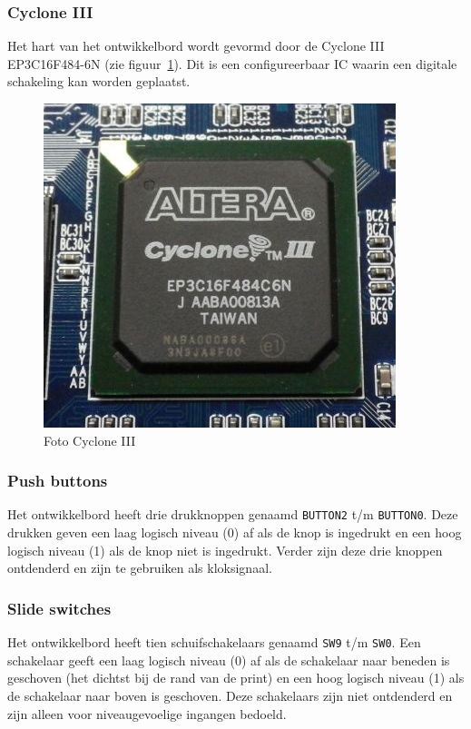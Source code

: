 \documentclass[a4paper,12pt,fleqn,twoside]{book}
\newcommand{\naam}[1]{\texttt{#1}}
\begin{document}
\subsubsection{Cyclone III}
Het hart van het ontwikkelbord wordt gevormd door de Cyclone III EP3C16F484-6N
(zie figuur~\ref{fig:ep3c16f484c6n}). Dit is een configureerbaar IC waarin een
digitale schakeling kan worden geplaatst.

\begin{figure}[H]
\centering
\includegraphics[scale=0.40]{ep3c16f484c6n.jpg}
\caption{Foto Cyclone III}
\label{fig:ep3c16f484c6n}
\end{figure}

\subsubsection{Push buttons}
Het ontwikkelbord heeft drie drukknoppen genaamd \naam{BUTTON2} t/m
\naam{BUTTON0}. Deze drukken geven een laag logisch
niveau (0) af als de knop is ingedrukt en een hoog logisch niveau (1) als de
knop niet is ingedrukt. Verder zijn deze drie knoppen ontdenderd en zijn te
gebruiken als kloksignaal.

\subsubsection{Slide switches}
Het ontwikkelbord heeft tien schuifschakelaars genaamd \naam{SW9} t/m
\naam{SW0}. Een schakelaar geeft een laag
logisch niveau (0) af als de schakelaar naar beneden is geschoven (het dichtst
bij de rand van de print) en een hoog logisch niveau (1) als de schakelaar naar
boven is geschoven. Deze schakelaars zijn niet ontdenderd en zijn alleen voor
niveaugevoelige ingangen bedoeld.
\end{document}
